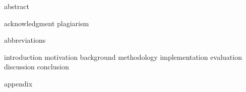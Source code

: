 \documentclass[paper=a4,twoside=true,fontsize=11pt,numbers=noendperiod,chapterprefix=false]{scrbook}
\begin{document}
{abstract}

\cleardoublepage

\cleardoublepage

{acknowledgment}
{plagiarism}

\tableofcontents
{}
\cleardoublepage

{abbreviations}
\cleardoublepage

\listoffigures
{}
\cleardoublepage

\listoftables
{}
\cleardoublepage

\renewcommand*{\chapterpagestyle}{mychapterpagestyle}
\renewcommand*{\chapterformat}{} %

{introduction}
{motivation}
{background}
{methodology}
{implementation}
{evaluation}
{discussion}
{conclusion}


\appendix
\clearpage
\renewcommand*{\chapterpagestyle}{myappendixpagestyle}
{appendix}

\clearpage
\renewcommand*{\chapterpagestyle}{empty}
\nocite{*}
% 

\end{document}
